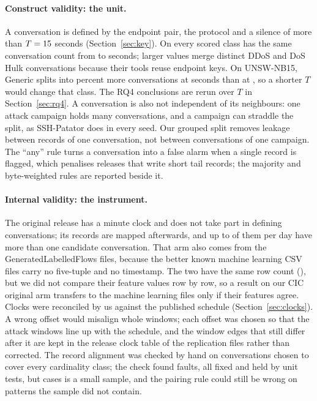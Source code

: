 \paragraph{Construct validity: the unit.} A conversation is defined by the endpoint pair, the protocol and a silence of more than $T = 15$ seconds (Section~\ref{sec:key}). On \cicids{} every scored class has the same conversation count from \NsweepCicStableMin{} to \NsweepCicStableMax{} seconds; larger values merge distinct DDoS and DoS Hulk conversations because their tools reuse endpoint keys. On UNSW-NB15, Generic splits into \NsweepGenericFivePct{} percent more conversations at \NsweepCicStableMin{} seconds than at \SetT{}, so a shorter $T$ would change that class. The RQ4 conclusions are rerun over $T$ in Section~\ref{sec:rq4}. A conversation is also not independent of its neighbours: one attack campaign holds many conversations, and a campaign can straddle the split, as SSH-Patator does in every seed. Our grouped split removes leakage between records of one conversation, not between conversations of one campaign. The ``any'' rule turns a conversation into a false alarm when a single record is flagged, which penalises releases that write short tail records; the majority and byte-weighted rules are reported beside it.

\paragraph{Internal validity: the instrument.} The original \cicids{} release has a minute clock and does not take part in defining conversations; its records are mapped afterwards, and up to \NnondefAmbigMax{} of them per day have more than one candidate conversation. That arm also comes from the GeneratedLabelledFlows files, because the better known machine learning CSV files carry no five-tuple and no timestamp. The two have the same row count (\NcicRows{}), but we did not compare their feature values row by row, so a result on our CIC original arm transfers to the machine learning files only if their features agree. Clocks were reconciled by us against the published schedule (Section~\ref{sec:clocks}). A wrong offset would misalign whole windows; each offset was chosen so that the attack windows line up with the schedule, and the window edges that still differ after it are kept in the release clock table of the replication files rather than corrected. The record alignment was checked by hand on \NhandCases{} conversations chosen to cover every cardinality class; the check found  faults, all fixed and held by unit tests, but \NhandCases{} cases is a small sample, and the pairing rule could still be wrong on patterns the sample did not contain.

